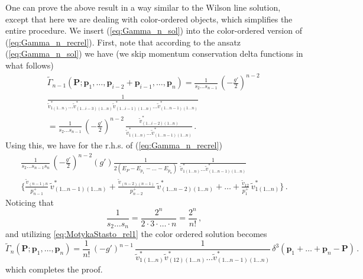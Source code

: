 \documentclass[english,american]{article}
\begin{document}
One can prove the above result in a way similar to the Wilson line solution, except that here we are dealing with color-ordered objects, which simplifies the entire procedure.
We insert (\ref{eq:Gamma_n_sol}) into the color-ordered version of
(\ref{eq:Gamma_n_recrel}). First, note that according to the ansatz
(\ref{eq:Gamma_n_sol}) we have (we skip momentum conservation delta
functions in what follows)
\begin{multline}
\tilde{\Gamma}_{n-1}\left(\mathbf{P};\mathbf{p}_{1},\dots,\mathbf{p}_{i-2}+\mathbf{p}_{i-1},\dots,\mathbf{p}_{n}\right)=\frac{1}{s_{2}\dots s_{n-1}}\,\left(-\frac{g'}{2}\right)^{n-2}\,\\
\frac{1}{\tilde{v}_{1\left(1\dots n\right)}^{*}\dots\tilde{v}_{\left(1\dots i-3\right)\left(1\dots n\right)}^{*}\tilde{v}_{\left(1\dots i-1\right)\left(1\dots n\right)}^{*}\dots\tilde{v}_{\left(1\dots n-1\right)\left(1\dots n\right)}^{*}}\\
=\frac{1}{s_{2}\dots s_{n-1}}\,\left(-\frac{g'}{2}\right)^{n-2}\,\frac{\tilde{v}_{\left(1\dots i-2\right)\left(1\dots n\right)}^{*}}{\tilde{v}_{1\left(1\dots n\right)}^{*}\dots\tilde{v}_{\left(1\dots n-1\right)\left(1\dots n\right)}^{*}}\,.
\end{multline}
Using this, we have for the r.h.s. of (\ref{eq:Gamma_n_recrel})
\begin{multline}
\frac{1}{s_{2}\dots s_{n-1}s_{n}}\,\left(-\frac{g'}{2}\right)^{n-2}\left(g'\right)\frac{1}{2\left(E_{P}-E_{p_{1}}-\dots-E_{p_{n}}\right)}\,\frac{1}{\tilde{v}_{1\left(1\dots n\right)}^{*}\dots\tilde{v}_{\left(1\dots n-1\right)\left(1\dots n\right)}^{*}}\\
\Bigg\{\frac{\tilde{v}_{\left(n-1\right)n}}{p_{n-1}^{+}}\,\tilde{v}_{\left(1\dots n-1\right)\left(1\dots n\right)}^{*}+\frac{\tilde{v}_{\left(n-2\right)\left(n-1\right)}}{p_{n-2}^{+}}\,\tilde{v}_{\left(1\dots n-2\right)\left(1\dots n\right)}^{*}+\dots+\frac{\tilde{v}_{12}}{p_{1}^{+}}\,\tilde{v}_{1\left(1\dots n\right)}^{*}\Bigg\}\,.
\end{multline}
 Noticing that
\begin{equation}
\frac{1}{s_{2}\dots s_{n}}=\frac{2^{n}}{2\cdot3\cdot\dots\cdot n}=\frac{2^{n}}{n!}\,,
\end{equation}
and utilizing \eqref{eq:MotykaStasto_rel1} the color ordered solution becomes
\begin{equation}
\tilde{\Gamma}_{n}\left(\mathbf{P};\mathbf{p}_{1},\dots,\mathbf{p}_{n}\right)=\frac{1}{n!}\,\left(-g'\right)^{n-1}\,\frac{1}{\tilde{v}_{1\left(1\dots n\right)}^{*}\tilde{v}_{\left(12\right)\left(1\dots n\right)}^{*}\dots\tilde{v}_{\left(1\dots n-1\right)\left(1\dots n\right)}^{*}}\,\delta^{3}\left(\mathbf{p}_{1}+\dots+\mathbf{p}_{n}-\mathbf{P}\right)\,.\label{eq:Gamma_n_sol-1}
\end{equation}
which completes the proof. 
\end{document}
